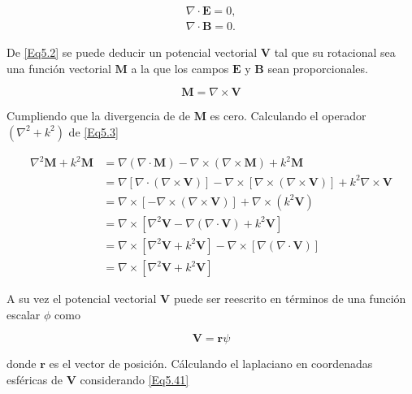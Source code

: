 \documentclass[a4paper,10pt]{article}
\begin{document}
\begin{subequations}
\begin{align}
\nabla\cdot\textbf{E}=0,\\
\nabla\cdot\textbf{B}=0.
\end{align}
\label{Eq5.2}
\end{subequations}

De \eqref{Eq5.2} se puede deducir un potencial vectorial $\textbf{V}$ tal que su rotacional sea una función vectorial $\textbf{M}$ a la que los campos $\textbf{E}$ y $\textbf{B}$ sean proporcionales. 

\begin{equation}
\textbf{M}=\nabla\times\textbf{V}
\label{Eq5.3}
\end{equation}

Cumpliendo que la divergencia de de $\textbf{M}$ es cero. Calculando el operador $(\nabla^2+k^2)$ de \eqref{Eq5.3}

\begin{subequations}
\begin{align}
\nabla^2\textbf{M}+k^2\textbf{M}
&=\nabla(\nabla\cdot\textbf{M})-\nabla\times(\nabla\times\textbf{M})+k^2\textbf{M}	\\
&=\nabla[\nabla\cdot(\nabla\times\textbf{V})]-\nabla\times[\nabla\times(\nabla\times\textbf{V})]+k^2\nabla\times\textbf{V}	\\
&=\nabla\times[-\nabla\times(\nabla\times\textbf{V})]+\nabla\times(k^2\textbf{V})	\\
&=\nabla\times[\nabla^2\textbf{V}-\nabla(\nabla\cdot\textbf{V})+k^2\textbf{V}]	\\
&=\nabla\times[\nabla^2\textbf{V}+k^2\textbf{V}]-\nabla\times[\nabla(\nabla\cdot\textbf{V})]	\\
&=\nabla\times[\nabla^2\textbf{V}+k^2\textbf{V}]
\end{align}
\label{Eq5.40}
\end{subequations}

A su vez el potencial vectorial $\textbf{V}$ puede ser reescrito en términos de una función escalar $\phi$ como

\begin{equation}
\textbf{V}=\textbf{r}\psi
\label{Eq5.41}
\end{equation}

donde $\textbf{r}$ es el vector de posición. Cálculando el laplaciano en coordenadas esféricas de $\textbf{V}$ considerando \eqref{Eq5.41}
\end{document}
